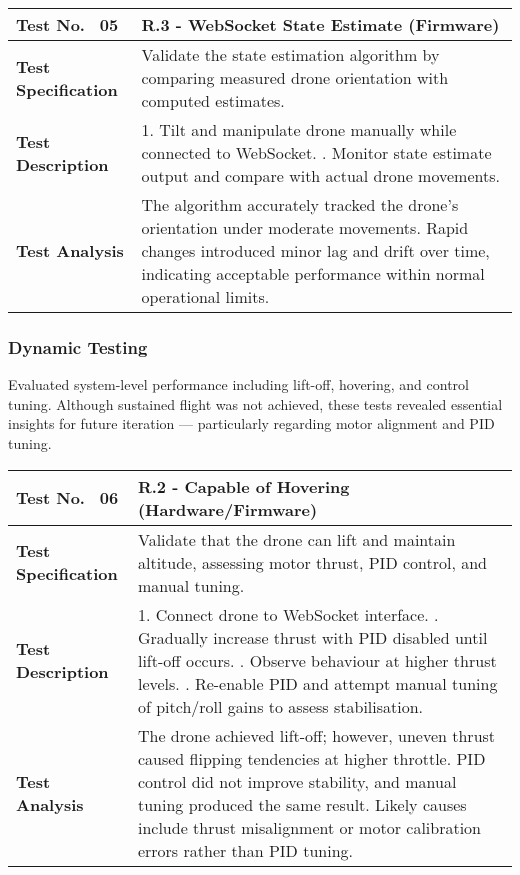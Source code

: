 \begin{table}[H]
\centering
\renewcommand{\arraystretch}{1.2}
\begin{tabular}{|p{3.5cm}|p{12cm}|}
\hline
\textbf{Test No. \, 05} & \textbf{R.3 - WebSocket State Estimate} (Firmware) \\ \hline

\textbf{Test Specification} & 
Validate the state estimation algorithm by comparing measured drone orientation with computed estimates. \\ \hline

\textbf{Test Description} & 
1. Tilt and manipulate drone manually while connected to WebSocket. \newline
2. Monitor state estimate output and compare with actual drone movements. \\ \hline

\textbf{Test Analysis} & 
The algorithm accurately tracked the drone's orientation under moderate movements. Rapid changes introduced minor lag and drift over time, indicating acceptable performance within normal operational limits. \\ \hline
\end{tabular}
\end{table}

\subsubsection{Dynamic Testing} \leavevmode

Evaluated system-level performance including lift-off, hovering, and control tuning. Although sustained flight was not achieved, these tests revealed essential insights for future iteration — particularly regarding motor alignment and PID tuning. 

\begin{table}[H]
\centering
\renewcommand{\arraystretch}{1.2}
\begin{tabular}{|p{3.5cm}|p{12cm}|}
\hline
\textbf{Test No. \, 06} & \textbf{R.2 - Capable of Hovering} (Hardware/Firmware) \\ \hline
\textbf{Test Specification} & 
Validate that the drone can lift and maintain altitude, assessing motor thrust, PID control, and manual tuning. \\ \hline
\textbf{Test Description} & 
1. Connect drone to WebSocket interface. \newline
2. Gradually increase thrust with PID disabled until lift-off occurs. \newline
3. Observe behaviour at higher thrust levels. \newline
4. Re-enable PID and attempt manual tuning of pitch/roll gains to assess stabilisation. \\ \hline
\textbf{Test Analysis} & 
The drone achieved lift-off; however, uneven thrust caused flipping tendencies at higher throttle. PID control did not improve stability, and manual tuning produced the same result. Likely causes include thrust misalignment or motor calibration errors rather than PID tuning. \\ \hline
\end{tabular}
\end{table}

